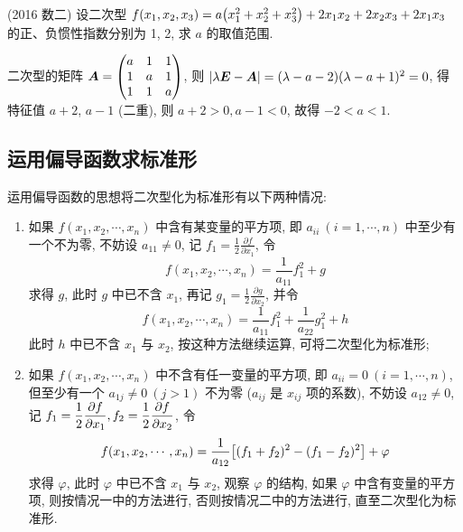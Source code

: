 \begin{example}
    (2016 数二) 设二次型 $f(x_1,x_2,x_3)=a\qty(x_1^2+x_2^2+x_3^2)+2x_1x_2+2x_2x_3+2x_1x_3$ 的正、负惯性指数分别为 1, 2, 求 $a$ 的取值范围.
\end{example}
\begin{solution}
    二次型的矩阵 $\vb*{A}=\mqty(a&1&1\\1&a&1\\1&1&a)$, 则 $|\lambda\vb*{E}-\vb*{A}|=(\lambda-a-2)(\lambda-a+1)^2=0$, 得特征值 $a+2$, $a-1$ (二重), 
    则 $a+2>0,a-1<0$, 故得 $-2<a<1.$
\end{solution}

\subsection{运用偏导函数求标准形}

运用偏导函数的思想将二次型化为标准形有以下两种情况:
\begin{enumerate}[label=(\arabic{*})]
    \item 如果 $ f(x_1,x_2,\cdots,x_n) $ 中含有某变量的平方项, 即 $ a_{i i}~ (i=1, \cdots, n) $ 中至少有一个不为零, 
          不妨设 $ a_{11} \neq 0 $, 记 $ \displaystyle f_{1}=\frac{1}{2} \frac{\partial f}{\partial x_{1}}$, 
          令 $$f(x_1,x_2,\cdots,x_n)=\frac{1}{a_{11}}f_1^2+g$$
          求得 $ g $, 此时 $ g $ 中已不含 $ x_{1}$, 再记 $ \displaystyle g_{1}=\frac{1}{2} \frac{\partial g}{\partial x_{2}} $, 并令
          $$f(x_1,x_2,\cdots,x_n)=\frac{1}{a_{11}}f_1^2+\frac{1}{a_{22}}g_1^2+h$$
          此时 $h$ 中已不含 $x_1$ 与 $x_2$, 按这种方法继续运算, 可将二次型化为标准形;
    \item 如果 $f(x_1,x_2,\cdots,x_n)$ 中不含有任一变量的平方项, 即 $a_{ii}=0~ (i=1,\cdots,n)$, 但至少有一个 $a_{1j}\neq 0~ (j>1)$ 不为零 ($a_{ij}$ 是 $x_{ij}$ 项的系数), 
          不妨设 $a_{12}\neq 0$, 记 $f_1=\dfrac{1}{2}\displaystyle\pdv{f}{x_1},f_2=\dfrac{1}{2}\displaystyle\pdv{f}{x_2}$, 令
          $$f(x_1,x_2,\cdots,x_n)=\dfrac{1}{a_{12}}\qty[(f_1+f_2)^2-(f_1-f_2)^2]+\varphi$$
          求得 $\varphi$, 此时 $\varphi$ 中已不含 $x_1$ 与 $x_2$, 观察 $\varphi$ 的结构, 如果 $\varphi$ 中含有变量的平方项, 则按情况一中的方法进行, 否则按情况二中的方法进行, 直至二次型化为标准形.
\end{enumerate}

